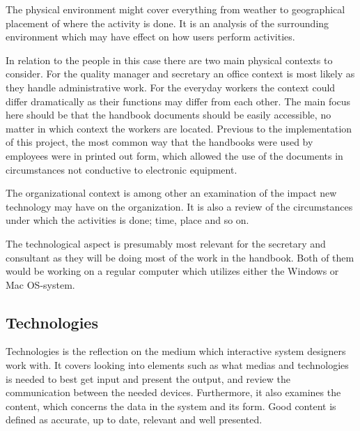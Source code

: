 The physical environment might cover everything from weather to geographical placement of where the activity is done.
It is an analysis of the surrounding environment which may have effect on how users perform activities.
\citep{Benyon}

In relation to the people in this case there are two main physical contexts to consider.
For the quality manager and secretary an office context is most likely as they handle administrative work.
For the everyday workers the context could differ dramatically as their functions may differ from each other.
The main focus here should be that the handbook documents should be easily accessible, no matter in which context the workers are located.
Previous to the implementation of this project, the most common way that the handbooks were used by employees were in printed out form, which allowed the use of the documents in circumstances not conductive to electronic equipment. %



The organizational context is among other an examination of the impact new technology may have on the organization.
It is also a review of the circumstances under which the activities is done; time, place and so on.
\citep{Benyon}


The technological aspect is presumably most relevant for the secretary and consultant as they will be doing most of the work in the handbook.
Both of them would be working on a regular computer which utilizes either the Windows or Mac OS-system.

\subsection{Technologies}
Technologies is the reflection on the medium which interactive system designers work with.
It covers looking into elements such as what medias and technologies is needed to best get input and present the output, and review the communication between the needed devices.
Furthermore, it also examines the content, which concerns the data in the system and its form.
Good content is defined as accurate, up to date, relevant and well presented.
\citep{Benyon}

